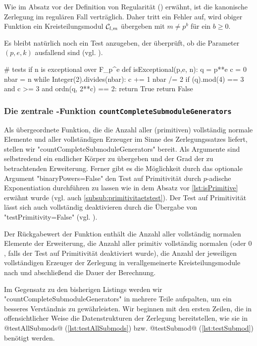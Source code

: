 Wie im Absatz vor der Definition von Regularität ()
erwähnt, ist die
kanonische Zerlegung im regulären Fall verträglich. Daher tritt ein Fehler auf,
wird obiger Funktion ein Kreisteilungsmodul $\mathcal{C}_{l,m}$ übergeben mit 
$m \neq p^b$ für ein $b\geq 0$.

Es bleibt natürlich noch ein Test anzugeben, der überprüft, ob 
die Parameter $(p,e,k)$ ausfallend sind (vgl. ).

\begin{sagecode}[caption={Aus \url{../Sage/enumeratePCNs.spyx}}]
# tests if n is exceptional over F_p^e
def isExceptional(p,e, n):
    q = p**e
    c = 0
    nbar = n
    while Integer(2).divides(nbar):
        c += 1
        nbar /= 2
    if (q).mod(4) == 3  and c >= 3  and ordn(q, 2**c) == 2:
        return True
    return False
\end{sagecode}  


\subsubsection{Die zentrale \sage-Funktion 
  \texttt{countCompleteSubmoduleGenerators}}

Als übergeordnete Funktion, die die Anzahl aller (primitiven) vollständig
normale Elemente und aller vollständigen Erzeuger im Sinne des Zerlegungssatzes
liefert, stellen wir "countCompleteSubmoduleGenerators" bereit. Als Argumente
sind selbstredend ein endlicher Körper zu übergeben und der Grad der zu
betrachtenden Erweiterung. Ferner gibt es die Möglichkeit durch das optionale
Argument "binaryPowers=False" den Test auf Primitivität durch $p$-adische
Exponentiation durchführen zu lassen wie in dem Absatz vor 
\autoref{lst:isPrimitive} erwähnt wurde (vgl. auch 
\autoref{subsub:primitivitaetstest}). Der Test auf Primitivität lässt sich auch
vollständig deaktivieren durch die Übergabe von "testPrimitivity=False"
(vgl. ).

Der Rückgabewert der Funktion enthält die Anzahl aller vollständig normalen
Elemente der Erweiterung, die Anzahl aller primitiv vollständig normalen (oder
$0$, falls der Test auf Primitivität deaktiviert wurde), 
die Anzahl der jeweiligen vollständigen Erzeuger der Zerlegung in
verallgemeinerte Kreisteilungsmodule nach  und
abschließend die Dauer der Berechnung.

Im Gegensatz zu den bisherigen Listings werden wir
"countCompleteSubmoduleGenerators" in mehrere Teile aufspalten, um ein besseres
Verständnis zu gewährleisten. Wir beginnen mit den ersten Zeilen, die in
offensichtlicher Weise die Datenstrukturen der Zerlegung bereitstellen, wie sie
in @testAllSubmods@ (\autoref{lst:testAllSubmods}) bzw. @testSubmod@ 
(\autoref{lst:testSubmod}) benötigt werden.



